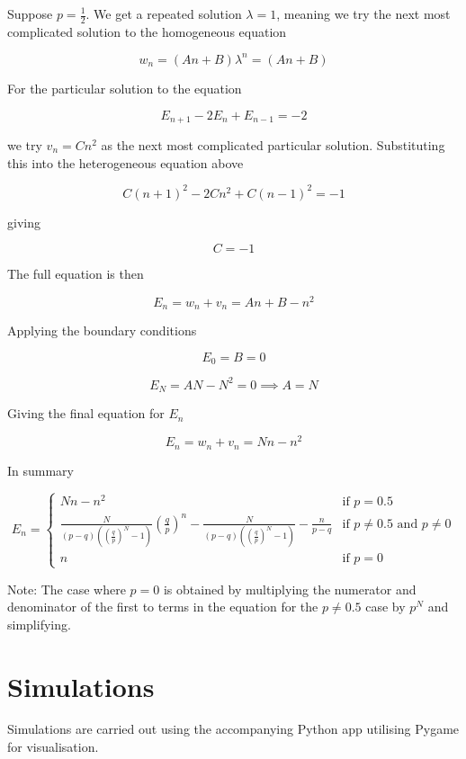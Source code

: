 \documentclass{article}
\begin{document}
Suppose $p = \frac{1}{2}$. We get a repeated solution $\lambda = 1$, meaning we try the next most complicated solution to the homogeneous equation

$$w_n = (An+B) \lambda^n = (An+B)$$

For the particular solution to the equation

$$E_{n+1} - 2 E_n + E_{n-1} = -2$$

we try $v_n = Cn^2$ as the next most complicated particular solution. Substituting this into the heterogeneous equation above

$$C(n+1)^2 - 2Cn^2 + C(n-1)^2 = -1$$

giving 

$$C = -1$$

The full equation is then

$$E_n = w_n + v_n = An + B - n^2$$

Applying the boundary conditions

$$E_0 = B = 0$$

$$E_N = AN - N^2 = 0 \implies A = N$$

Giving the final equation for $E_n$

\begin{equation}
    E_n = w_n + v_n = Nn - n^2 
\end{equation}

In summary

\begin{equation}
   E_n=%
   \begin{cases}
     Nn - n^2 &\text{if $p = 0.5$} \\
     \frac{N}{(p-q)((\frac{q}{p})^N - 1)} (\frac{q}{p})^n - \frac{N}{(p-q)((\frac{q}{p})^N - 1)} - \frac{n}{p-q}  &\text{if $p \neq 0.5$ and $p \neq 0$} \\
     n &\text{if $p = 0$}
   \end{cases}
\end{equation}

Note: The case where $p=0$ is obtained by multiplying the numerator and denominator of the first to terms in the equation for the $p\neq 0.5$ case by $p^N$ and simplifying.

\section{Simulations} %

Simulations are carried out using the accompanying Python app utilising Pygame for visualisation. 
\end{document}
